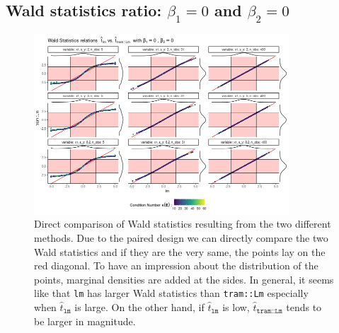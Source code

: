 \documentclass[11pt,a4paper,twoside]{book}\usepackage[]{graphicx}\usepackage[]{xcolor}
\begin{document}
\subsection{Wald statistics ratio: $\beta_1=0$ and $\beta_2=0$}
\begin{figure}[H]
\centering
\vspace*{-0.5cm}
\centering
\includegraphics[width=0.85\textwidth]{../fromsim/simres_bivar41-1.png}
\vspace*{-0.5cm}
\caption{Direct comparison of Wald statistics resulting from the two different methods. Due to the paired design we can directly compare the two Wald statistics and if they are the very same, the points lay on the red diagonal. To have an impression about the distribution of the points, marginal densities are added at the sides. In general, it seems like that \texttt{lm} has larger Wald statistics than \texttt{tram::Lm} especially when $\hat{t}_\texttt{lm}$ is large. On the other hand, if  $\hat{t}_\texttt{lm}$ is low, $\hat{t}_\texttt{tram::Lm}$ tends to be larger in magnitude.}
\label{fig:simres_bivar2}
\end{figure}

\vspace*{-1cm}
\end{document}
